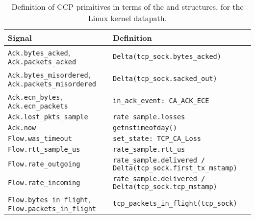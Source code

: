 \begin{table}
    \centering
    \footnotesize
    \begin{tabular}{p{}p{}}
        \textbf{Signal} & \textbf{Definition} \\
        \hline
        \texttt{Ack.bytes\_acked}, \texttt{Ack.packets\_acked}             & \texttt{Delta(tcp\_sock.bytes\_acked)} \\
        \texttt{Ack.bytes\_misordered}, \texttt{Ack.packets\_misordered}   & \texttt{Delta(tcp\_sock.sacked\_out)} \\
        \texttt{Ack.ecn\_bytes}, \texttt{Ack.ecn\_packets}                 & \texttt{in\_ack\_event: CA\_ACK\_ECE} \\
        \texttt{Ack.lost\_pkts\_sample}                                    & \texttt{rate\_sample.losses} \\
        \texttt{Ack.now}                                                   & \texttt{getnstimeofday()}\\
        \texttt{Flow.was\_timeout}                                         & \texttt{set\_state: TCP\_CA\_Loss} \\
        \texttt{Flow.rtt\_sample\_us}                                      & \texttt{rate\_sample.rtt\_us} \\
        \texttt{Flow.rate\_outgoing}                                       & \texttt{rate\_sample.delivered / Delta(tcp\_sock.first\_tx\_mstamp)} \\
        \texttt{Flow.rate\_incoming}                                       & \texttt{rate\_sample.delivered / Delta(tcp\_sock.tcp\_mstamp)}  \\
        \texttt{Flow.bytes\_in\_flight}, \texttt{Flow.packets\_in\_flight} & \texttt{tcp\_packets\_in\_flight(tcp\_sock)} \\
    \end{tabular}
    \caption{Definition of CCP primitives in terms of the  and  structures, for the Linux kernel datapath.}\label{tab:api:kernel}
\end{table}